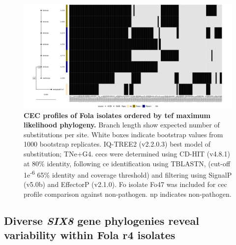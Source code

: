 \begin{figure}
    \centering
    \includegraphics[width=\textwidth]{Figures/HeatmapAndPhylo_LactucaeOnly.png}
    \captionsetup{width=24cm}
    \caption[CEC profiles of \ac{Fola} isolates ordered by \ac{tef} maximum likelihood phylogeny.]{\textbf{CEC profiles of \ac{Fola} isolates ordered by \ac{tef} maximum likelihood phylogeny.}  Branch length show expected number of substitutions per site. White boxes indicate bootstrap values from 1000 bootstrap replicates. IQ-TREE2 (v2.2.0.3) best model of substitution; TNe+G4. \Acp{cec} were determined using CD-HIT (v4.8.1) at 80\% identity, following \ac{ce} identification using TBLASTN, (cut-off 1e\textsuperscript{-6} 65\% identity and coverage threshold) and filtering using SignalP (v5.0b) and EffectorP (v2.1.0). \ac{Fo} isolate Fo47 was included for \ac{cec} profile comparison against non-pathogen. np indicates non-pathogen.}
    \label{fig:MaeiHeatmap-lettuce}
\end{figure}

\subsection{Diverse \textit{SIX8} gene phylogenies reveal variability within \acl{Fola} \acl{r4} isolates}


